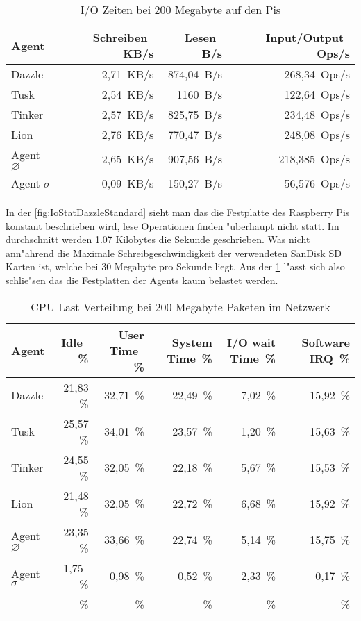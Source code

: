 \begin{table}
\centering
\begin{tabular}{l%
 r<{\,KB/s}%
 r<{\,B/s}%
 r<{\,Ops/s}%
}
Agent	  			& Schreiben	 	& Lesen			& Input/Output 		\\	
\hline
Dazzle 				& 2,71			& 874,04		& 268,34	        \\
Tusk 				& 2,54			& 1160			& 122,64			\\
Tinker				& 2,57 			& 825,75		& 234,48		 	\\
Lion				& 2,76			& 770,47		& 248,08	 	\\
Agent $\diameter $  		& 2,65			& 907,56		& 218,385		\\   
Agent $\sigma $ 		& 0,09  		& 150,27		& 56,576		\\
\end{tabular}
\caption{I/O Zeiten bei 200 Megabyte auf den Pis}
\label{tab:NormalbetriebIoStat200Mb}
\end{table}


In der \cref{fig:IoStatDazzleStandard} sieht man das die Festplatte des Raspberry Pis konstant beschrieben wird, lese Operationen finden "uberhaupt nicht statt. %
Im durchschnitt werden 1.07 Kilobytes die Sekunde geschrieben.  %
Was nicht ann"ahrend die Maximale Schreibgeschwindigkeit der verwendeten %
SanDisk SD Karten ist, welche bei 30 Megabyte pro Sekunde \autocite{san:sd} liegt. %
Aus der \cref{tab:NormalbetriebIoStat200Mb} l"asst sich also schlie"sen das die Festplatten der Agents kaum belastet werden. %

\begin{table}
\centering
\begin{tabular}{l%
 r<{\,\%}%
 r<{\,\%}%
 r<{\,\%}%
 r<{\,\%}%
 r<{\,\%}%
}
Agent  				& Idle			& User Time		& System Time		& I/O wait Time	& Software IRQ	\\
\hline
Dazzle 				& 21,83			& 32,71			& 22,49 		& 7,02		& 15,92	\\
Tusk 				& 25,57			& 34,01			& 23,57			& 1,20		& 15,63	\\
Tinker				& 24,55			& 32,05			& 22,18			& 5,67		& 15,53	\\
Lion				& 21,48			& 32,05			& 22,72			& 6,68		& 15,92	\\ 
Agent $\diameter $  		& 23,35			& 33,66			& 22,74			& 5,14	 	& 15,75	\\   
Agent $\sigma $			&  1,75			&  0,98			&  0,52			& 2,33		& 0,17  \\ 

&\end{tabular}
\caption{CPU Last Verteilung bei 200 Megabyte Paketen im Netzwerk}
\label{tab:CPUlastverteilung200Mb}
\end{table}

